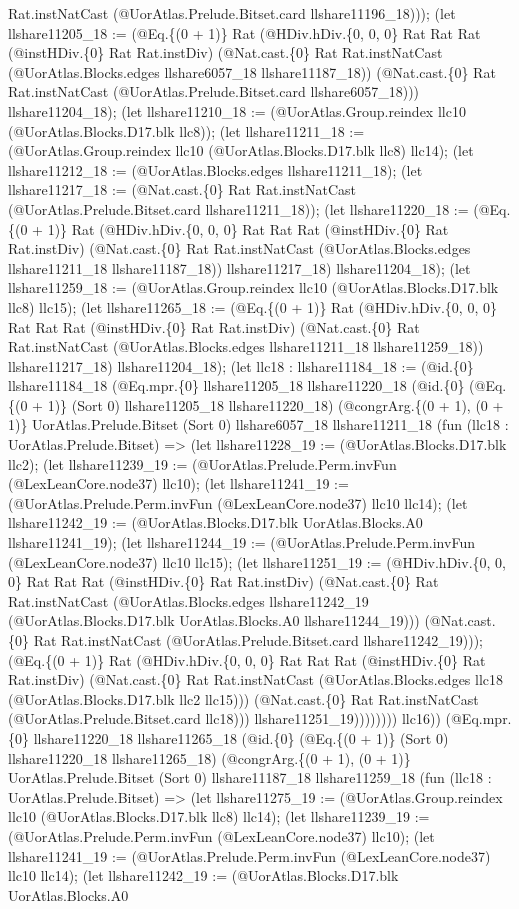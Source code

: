 \documentclass[11pt]{article}
\begin{document}
Rat.instNatCast (@UorAtlas.Prelude.Bitset.card llshare11196\_18))); (let llshare11205\_18 := (@Eq.\{(0 + 1)\} Rat (@HDiv.hDiv.\{0, 0, 0\} Rat Rat Rat (@instHDiv.\{0\} Rat Rat.instDiv) (@Nat.cast.\{0\} Rat Rat.instNatCast (@UorAtlas.Blocks.edges llshare6057\_18 llshare11187\_18)) (@Nat.cast.\{0\} Rat Rat.instNatCast (@UorAtlas.Prelude.Bitset.card llshare6057\_18))) llshare11204\_18); (let llshare11210\_18 := (@UorAtlas.Group.reindex llc10 (@UorAtlas.Blocks.D17.blk llc8)); (let llshare11211\_18 := (@UorAtlas.Group.reindex llc10 (@UorAtlas.Blocks.D17.blk llc8) llc14); (let llshare11212\_18 := (@UorAtlas.Blocks.edges llshare11211\_18); (let llshare11217\_18 := (@Nat.cast.\{0\} Rat Rat.instNatCast (@UorAtlas.Prelude.Bitset.card llshare11211\_18)); (let llshare11220\_18 := (@Eq.\{(0 + 1)\} Rat (@HDiv.hDiv.\{0, 0, 0\} Rat Rat Rat (@instHDiv.\{0\} Rat Rat.instDiv) (@Nat.cast.\{0\} Rat Rat.instNatCast (@UorAtlas.Blocks.edges llshare11211\_18 llshare11187\_18)) llshare11217\_18) llshare11204\_18); (let llshare11259\_18 := (@UorAtlas.Group.reindex llc10 (@UorAtlas.Blocks.D17.blk llc8) llc15); (let llshare11265\_18 := (@Eq.\{(0 + 1)\} Rat (@HDiv.hDiv.\{0, 0, 0\} Rat Rat Rat (@instHDiv.\{0\} Rat Rat.instDiv) (@Nat.cast.\{0\} Rat Rat.instNatCast (@UorAtlas.Blocks.edges llshare11211\_18 llshare11259\_18)) llshare11217\_18) llshare11204\_18); (let llc18 : llshare11184\_18 := (@id.\{0\} llshare11184\_18 (@Eq.mpr.\{0\} llshare11205\_18 llshare11220\_18 (@id.\{0\} (@Eq.\{(0 + 1)\} (Sort 0) llshare11205\_18 llshare11220\_18) (@congrArg.\{(0 + 1), (0 + 1)\} UorAtlas.Prelude.Bitset (Sort 0) llshare6057\_18 llshare11211\_18 (fun (llc18 : UorAtlas.Prelude.Bitset) => (let llshare11228\_19 := (@UorAtlas.Blocks.D17.blk llc2); (let llshare11239\_19 := (@UorAtlas.Prelude.Perm.invFun (@LexLeanCore.node37) llc10); (let llshare11241\_19 := (@UorAtlas.Prelude.Perm.invFun (@LexLeanCore.node37) llc10 llc14); (let llshare11242\_19 := (@UorAtlas.Blocks.D17.blk UorAtlas.Blocks.A0 llshare11241\_19); (let llshare11244\_19 := (@UorAtlas.Prelude.Perm.invFun (@LexLeanCore.node37) llc10 llc15); (let llshare11251\_19 := (@HDiv.hDiv.\{0, 0, 0\} Rat Rat Rat (@instHDiv.\{0\} Rat Rat.instDiv) (@Nat.cast.\{0\} Rat Rat.instNatCast (@UorAtlas.Blocks.edges llshare11242\_19 (@UorAtlas.Blocks.D17.blk UorAtlas.Blocks.A0 llshare11244\_19))) (@Nat.cast.\{0\} Rat Rat.instNatCast (@UorAtlas.Prelude.Bitset.card llshare11242\_19))); (@Eq.\{(0 + 1)\} Rat (@HDiv.hDiv.\{0, 0, 0\} Rat Rat Rat (@instHDiv.\{0\} Rat Rat.instDiv) (@Nat.cast.\{0\} Rat Rat.instNatCast (@UorAtlas.Blocks.edges llc18 (@UorAtlas.Blocks.D17.blk llc2 llc15))) (@Nat.cast.\{0\} Rat Rat.instNatCast (@UorAtlas.Prelude.Bitset.card llc18))) llshare11251\_19)))))))) llc16)) (@Eq.mpr.\{0\} llshare11220\_18 llshare11265\_18 (@id.\{0\} (@Eq.\{(0 + 1)\} (Sort 0) llshare11220\_18 llshare11265\_18) (@congrArg.\{(0 + 1), (0 + 1)\} UorAtlas.Prelude.Bitset (Sort 0) llshare11187\_18 llshare11259\_18 (fun (llc18 : UorAtlas.Prelude.Bitset) => (let llshare11275\_19 := (@UorAtlas.Group.reindex llc10 (@UorAtlas.Blocks.D17.blk llc8) llc14); (let llshare11239\_19 := (@UorAtlas.Prelude.Perm.invFun (@LexLeanCore.node37) llc10); (let llshare11241\_19 := (@UorAtlas.Prelude.Perm.invFun (@LexLeanCore.node37) llc10 llc14); (let llshare11242\_19 := (@UorAtlas.Blocks.D17.blk UorAtlas.Blocks.A0 
\end{document}
